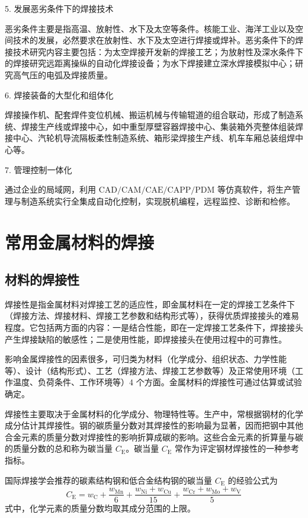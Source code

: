 \documentclass[UTF8]{ctexbook}
\newcommand{\◎}{\ensuremath{\bigcirc}}
\begin{document}
5. 发展恶劣条件下的焊接技术

恶劣条件主要是指高温、放射性、水下及太空等条件。核能工业、海洋工业以及空间技术的发展，必然要求在放射性、水下及太空进行焊接或焊补。恶劣条件下的焊接技术研究内容主要包括：为太空焊接开发新的焊接工艺；为放射性及深水条件下的焊接研究远距离操纵的自动化焊接设备；为水下焊接建立深水焊接模拟中心；研究高气压的电弧及焊接质量。

6. 焊接装备的大型化和组体化

焊接操作机、配套焊件变位机械、搬运机械与传输辊道的组合联动，形成了制造系统、焊接生产线或焊接中心，如中重型厚壁容器焊接中心、集装箱外壳整体组装焊接中心、汽轮机导流隔板柔性制造系统、箱形梁焊接生产线、机车车厢总装组焊中心等。

7. 管理控制一体化

通过企业的局域网，利用 $\text{CAD/CAM/CAE/CAPP/PDM}$ 等仿真软件，将生产管理与制造系统实行全集成自动化控制，实现脱机编程，远程监控、诊断和检修。

\section{常用金属材料的焊接}

\subsection{材料的焊接性}

焊接性是指金属材料对焊接工艺的适应性，即金属材料在一定的焊接工艺条件下（焊接方法、焊接材料、焊接工艺参数和结构形式等），获得优质焊接接头的难易程度。它包括两方面的内容：一是结合性能，即在一定焊接工艺条件下，焊接接头产生焊接缺陷的敏感性；二是使用性能，即焊接接头在使用过程中的可靠性。

影响金属焊接性的因素很多，可归类为材料（化学成分、组织状态、力学性能等）、设计（结构形式）、工艺（焊接方法、焊接工艺参数等）及正常使用环境（工作温度、负荷条件、工作环境等）4 个方面。金属材料的焊接性可通过估算或试验确定。

焊接性主要取决于金属材料的化学成分、物理特性等。生产中，常根据钢材的化学成分估计其焊接性。钢的碳质量分数对其焊接性的影响最为显著，因而把钢中其他合金元素的质量分数对焊接性的影响折算成碳的影响。这些合金元素的折算量与碳的质量分数的总和称为碳当量 $C_{\text{E}}$。碳当量 $C_{\text{E}}$ 常作为评定钢材焊接性的一种参考指标。

国际焊接学会推荐的碳素结构钢和低合金结构钢的碳当量 $C_{\text{E}}$ 的经验公式为
\[
C_{\text{E}} = w_{\text{C}} + \frac{w_{\text{Mn}}}{6} + \frac{w_{\text{Ni}} + w_{\text{Cu}}}{15} + \frac{w_{\text{Cr}} + w_{\text{Mo}} + w_{\text{V}}}{5}
\]
式中，化学元素的质量分数均取其成分范围的上限。
\end{document}
